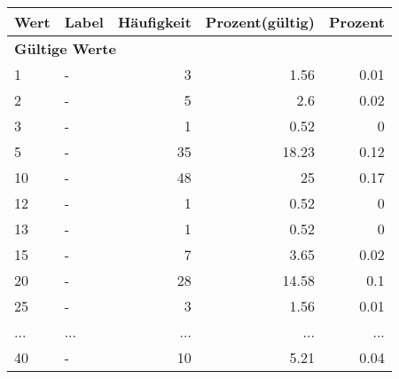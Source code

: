      \begin{longtable}{lXrrr}
     \toprule
     \textbf{Wert} & \textbf{Label} & \textbf{Häufigkeit} & \textbf{Prozent(gültig)} & \textbf{Prozent} \\
     \endhead
     \midrule
     \multicolumn{5}{l}{\textbf{Gültige Werte}}\\
        1 & \multicolumn{1}{X}{-} & %
          \num{3} &
          \num[round-mode=places,round-precision=2]{1.56} &
          \num[round-mode=places,round-precision=2]{0.01} \\
        2 & \multicolumn{1}{X}{-} & %
          \num{5} &
          \num[round-mode=places,round-precision=2]{2.6} &
          \num[round-mode=places,round-precision=2]{0.02} \\
        3 & \multicolumn{1}{X}{-} & %
          \num{1} &
          \num[round-mode=places,round-precision=2]{0.52} &
          \num[round-mode=places,round-precision=2]{0} \\
        5 & \multicolumn{1}{X}{-} & %
          \num{35} &
          \num[round-mode=places,round-precision=2]{18.23} &
          \num[round-mode=places,round-precision=2]{0.12} \\
        10 & \multicolumn{1}{X}{-} & %
          \num{48} &
          \num[round-mode=places,round-precision=2]{25} &
          \num[round-mode=places,round-precision=2]{0.17} \\
        12 & \multicolumn{1}{X}{-} & %
          \num{1} &
          \num[round-mode=places,round-precision=2]{0.52} &
          \num[round-mode=places,round-precision=2]{0} \\
        13 & \multicolumn{1}{X}{-} & %
          \num{1} &
          \num[round-mode=places,round-precision=2]{0.52} &
          \num[round-mode=places,round-precision=2]{0} \\
        15 & \multicolumn{1}{X}{-} & %
          \num{7} &
          \num[round-mode=places,round-precision=2]{3.65} &
          \num[round-mode=places,round-precision=2]{0.02} \\
        20 & \multicolumn{1}{X}{-} & %
          \num{28} &
          \num[round-mode=places,round-precision=2]{14.58} &
          \num[round-mode=places,round-precision=2]{0.1} \\
        25 & \multicolumn{1}{X}{-} & %
          \num{3} &
          \num[round-mode=places,round-precision=2]{1.56} &
          \num[round-mode=places,round-precision=2]{0.01} \\
       ... & ... & ... & ... & ... \\
        40 & \multicolumn{1}{X}{-} & %
          \num{10} &
          \num[round-mode=places,round-precision=2]{5.21} &
          \num[round-mode=places,round-precision=2]{0.04} \\


\end{longtable}
